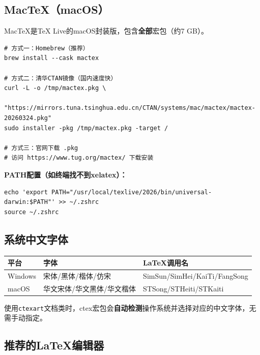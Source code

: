\subsection{MacTeX（macOS）}

MacTeX是TeX Live的macOS封装版，包含\textbf{全部}宏包（约7 GB）。

\begin{lstlisting}[style=shell]
# 方式一：Homebrew（推荐）
brew install --cask mactex

# 方式二：清华CTAN镜像（国内速度快）
curl -L -o /tmp/mactex.pkg \
  "https://mirrors.tuna.tsinghua.edu.cn/CTAN/systems/mac/mactex/mactex-20260324.pkg"
sudo installer -pkg /tmp/mactex.pkg -target /

# 方式三：官网下载 .pkg
# 访问 https://www.tug.org/mactex/ 下载安装
\end{lstlisting}

\textbf{PATH配置（如终端找不到xelatex）：}

\begin{lstlisting}[style=shell]
echo 'export PATH="/usr/local/texlive/2026/bin/universal-darwin:$PATH"' >> ~/.zshrc
source ~/.zshrc
\end{lstlisting}

\subsection{系统中文字体}

\begin{table}[H]
\centering
\begin{tabular}{lll}
\toprule
\textbf{平台} & \textbf{字体} & \textbf{LaTeX调用名} \\
\midrule
Windows & 宋体/黑体/楷体/仿宋 & SimSun/SimHei/KaiTi/FangSong \\
macOS & 华文宋体/华文黑体/华文楷体 & STSong/STHeiti/STKaiti \\
\bottomrule
\end{tabular}
\end{table}

\begin{notebox}[ctex自动适配]
使用\texttt{ctexart}文档类时，ctex宏包会\textbf{自动检测}操作系统并选择对应的中文字体，无需手动指定。
\end{notebox}

\subsection{推荐的LaTeX编辑器}

